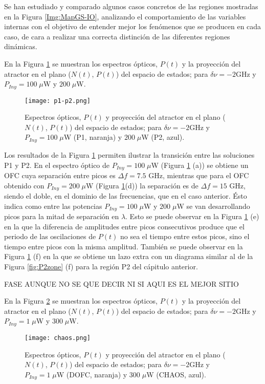 Se han estudiado y comparado algunos casos concretos de las regiones mostradas en la Figura \ref{Img:MapGS-IO}, analizando el comportamiento de las variables internas con el objetivo de entender mejor los fen\'omenos que se producen en cada caso, de cara a realizar una correcta distinci\'on de las diferentes regiones din\'amicas.

En la Figura \ref{fig:p1-p2} se muestran los espectros \'opticos, $P(t)$ y la proyecci\'on del atractor en el plano ($N(t)$, $P(t)$) del espacio de estados; para $\delta\nu = -2$GHz y $P_{Iny} = 100\;\mu$W y $200\;\mu$W.

	\begin{figure}[H]
		\centering
		\texttt{[image: p1-p2.png]}
		\caption{\label{fig:p1-p2}Espectros \'opticos, $P(t)$ y proyecci\'on del atractor en el plano ($N(t)$, $P(t)$) del espacio de estados; para $\delta\nu = -2$GHz y $P_{Iny} = 100\;\mu$W (P1, naranja) y $200\;\mu$W (P2, azul).}	
	\end{figure}

	Los resultados de la Figura \ref{fig:p1-p2} permiten ilustrar la transición entre las soluciones P1 y P2. En el espectro \'optico de $P_{Iny} = 100\;\mu$W (Figura \ref{fig:p1-p2} (a)) se obtiene un OFC cuya separaci\'on entre picos es $\Delta f = 7.5$ GHz, mientras que para el OFC obtenido con $P_{Iny} = 200\;\mu$W (Figura \ref{fig:p1-p2}(d)) la separaci\'on es de $\Delta f = 15$ GHz, siendo el doble, en el dominio de las frecuencias, que en el caso anterior. \'Esto indica como entre las potencias $P_{Iny} = 100\;\mu$W y $200\;\mu$W se van desarrollando picos para la mitad de separación en $\lambda$. Esto se puede observar en la Figura \ref{fig:p1-p2} (e) en la que la diferencia de amplitudes entre picos consecutivos produce que el periodo de las oscilaciones de $P(t)$ no sea el tiempo entre estos picos, sino el tiempo entre picos con la misma amplitud. Tambi\'en se puede observar en la Figura \ref{fig:p1-p2} (f) en la que se obtiene un lazo extra con un diagrama similar al de la Figura \ref{fig:P2zone} (f) para la regi\'on P2 del c\'apitulo anterior.

FASE AUNQUE NO SE QUE DECIR NI SI AQUI ES EL MEJOR SITIO

En la Figura \ref{fig:chaos} se muestran los espectros \'opticos, $P(t)$ y la proyecci\'on del atractor en el plano ($N(t)$, $P(t)$) del espacio de estados; para $\delta\nu = -2$GHz y $P_{Iny} = 1\;\mu$W y $300\;\mu$W.

	\begin{figure}[H]
		\centering
		\texttt{[image: chaos.png]}
		\caption{\label{fig:chaos}Espectros \'opticos, $P(t)$ y proyecci\'on del atractor en el plano ($N(t)$, $P(t)$) del espacio de estados; para $\delta\nu = -2$GHz y $P_{Iny} = 1\;\mu$W (DOFC, naranja) y $300\;\mu$W (CHAOS, azul).}	
	\end{figure}

